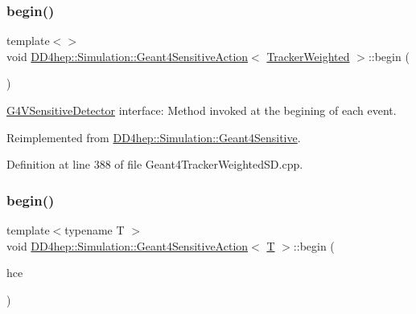 \subsubsection{\texorpdfstring{begin()}{begin()}\hspace{0.1cm}{\footnotesize\ttfamily [1/2]}}
{\footnotesize\ttfamily template$<$$>$ \\
void \hyperlink{class_d_d4hep_1_1_simulation_1_1_geant4_sensitive_action}{D\+D4hep\+::\+Simulation\+::\+Geant4\+Sensitive\+Action}$<$ \hyperlink{struct_d_d4hep_1_1_simulation_1_1_tracker_weighted}{Tracker\+Weighted} $>$\+::begin (\begin{DoxyParamCaption}\item[{G4\+H\+Cof\+This\+Event $\ast$}]{ }\end{DoxyParamCaption})\hspace{0.3cm}{\ttfamily [virtual]}}



\hyperlink{class_g4_v_sensitive_detector}{G4\+V\+Sensitive\+Detector} interface\+: Method invoked at the begining of each event. 



Reimplemented from \hyperlink{class_d_d4hep_1_1_simulation_1_1_geant4_sensitive_a2967b095e6c32ae82f68a8b25a086c86}{D\+D4hep\+::\+Simulation\+::\+Geant4\+Sensitive}.



Definition at line 388 of file Geant4\+Tracker\+Weighted\+S\+D.\+cpp.

\hypertarget{class_d_d4hep_1_1_simulation_1_1_geant4_sensitive_action_a2e9739b3741bb245e3cc7edb41e7374d}{}\label{class_d_d4hep_1_1_simulation_1_1_geant4_sensitive_action_a2e9739b3741bb245e3cc7edb41e7374d} 
\subsubsection{\texorpdfstring{begin()}{begin()}\hspace{0.1cm}{\footnotesize\ttfamily [2/2]}}
{\footnotesize\ttfamily template$<$typename T $>$ \\
void \hyperlink{class_d_d4hep_1_1_simulation_1_1_geant4_sensitive_action}{D\+D4hep\+::\+Simulation\+::\+Geant4\+Sensitive\+Action}$<$ \hyperlink{class_t}{T} $>$\+::begin (\begin{DoxyParamCaption}\item[{G4\+H\+Cof\+This\+Event $\ast$}]{hce }\end{DoxyParamCaption})\hspace{0.3cm}{\ttfamily [virtual]}}




